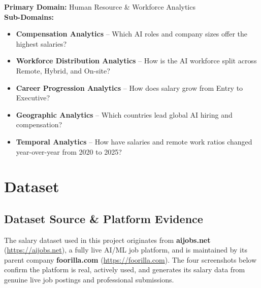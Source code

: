 \documentclass[12pt,a4paper]{article}
\begin{document}
\begin{infobox}[Domain]
\textbf{Primary Domain:} Human Resource \& Workforce Analytics\\[4pt]
\textbf{Sub-Domains:}
\begin{itemize}[leftmargin=1.5em, itemsep=2pt]
  \item \textbf{Compensation Analytics} -- Which AI roles and company sizes offer the highest salaries?
  \item \textbf{Workforce Distribution Analytics} -- How is the AI workforce split across Remote, Hybrid, and On-site?
  \item \textbf{Career Progression Analytics} -- How does salary grow from Entry to Executive?
  \item \textbf{Geographic Analytics} -- Which countries lead global AI hiring and compensation?
  \item \textbf{Temporal Analytics} -- How have salaries and remote work ratios changed year-over-year from 2020 to 2025?
\end{itemize}
\end{infobox}

\section{Dataset}

\subsection{Dataset Source \& Platform Evidence}

The salary dataset used in this project originates from
\textbf{aijobs.net} (\url{https://aijobs.net}), a fully live AI/ML job
platform, and is maintained by its parent company \textbf{foorilla.com}
(\url{https://foorilla.com}). The four screenshots below confirm the
platform is real, actively used, and generates its salary data from
genuine live job postings and professional submissions.
\end{document}
